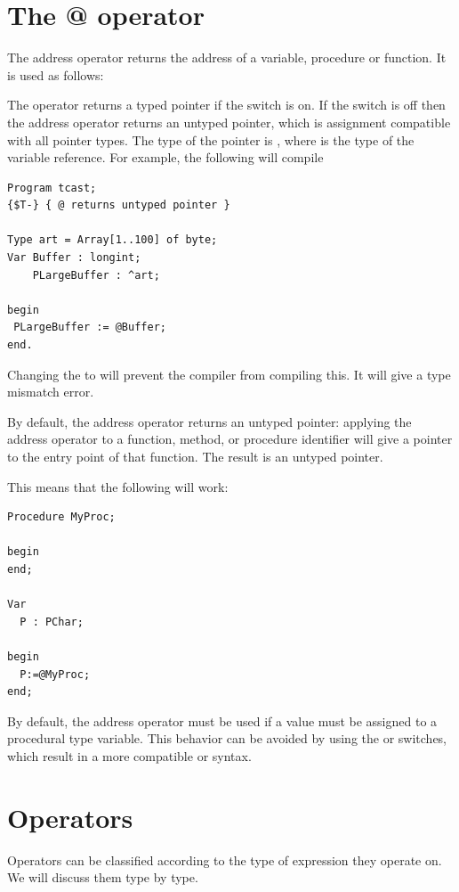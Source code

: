 \section{The @ operator}

The address operator  returns the address of a variable, procedure
or function. It is used as follows:

The  operator returns a typed pointer if the  switch is on.
If the  switch is off then the address operator returns an untyped
pointer, which is assignment compatible with all pointer types. The type of
the pointer is , where  is the type of the variable
reference.
For example, the following will compile
\begin{verbatim}
Program tcast;
{$T-} { @ returns untyped pointer }

Type art = Array[1..100] of byte;
Var Buffer : longint;
    PLargeBuffer : ^art;

begin
 PLargeBuffer := @Buffer;
end.
\end{verbatim}
Changing the  to  will prevent the compiler from
compiling this. It will give a type mismatch error.

By default, the address operator returns an untyped pointer: applying
the address operator to a function, method, or procedure identifier
will give a pointer to the entry point of that function.
The result is an untyped pointer.

This means that the following will work:
\begin{verbatim}
Procedure MyProc;

begin
end;

Var
  P : PChar;

begin
  P:=@MyProc;
end;
\end{verbatim}
By default, the address operator must be used if a value must be assigned
to a procedural type variable. This behavior can be avoided by using the
 or  switches, which result in a more compatible
\delphi or \tp syntax.

\section{Operators}
Operators can be classified according to the type of expression they
operate on. We will discuss them type by type.
%
